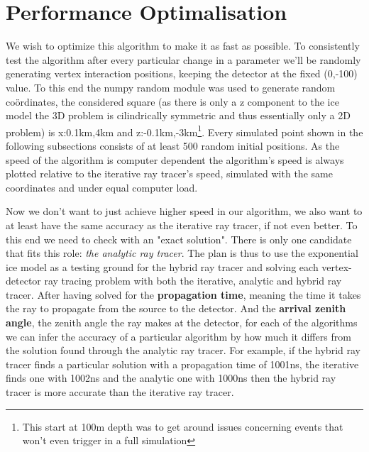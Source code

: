 \documentclass[11pt,a4paper,faculty=we,language=en,doctype=report]{cls/ugent-doc}
\begin{document}
\section{Performance Optimalisation} 
We wish to optimize this algorithm to make
it as fast as possible.  To consistently test the algorithm after every
particular change in a parameter we'll be randomly generating vertex
interaction positions, keeping the detector at the fixed (0,-100) value.  To
this end the numpy random module was used to generate random coördinates, the
considered square (as there is only a z component to the ice model the 3D
problem is cilindrically symmetric and thus essentially only a 2D problem) is
x:0.1km,4km and z:-0.1km,-3km\footnote{This start at 100m depth was to get
around issues concerning events that won't even trigger in a full simulation}.
Every simulated point shown in the following subsections consists of at least
500 random initial positions.  As the speed of the algorithm is computer
dependent the algorithm's speed is always plotted relative to the iterative ray
tracer's speed, simulated with the same coordinates and under equal computer load.

Now we don't want to just achieve higher speed in our algorithm, we also want
to at least have the same accuracy as the iterative ray tracer, if not even better.
To this end we need to check with an "exact solution". There is only one candidate
that fits this role: \textit{the analytic ray tracer}. The plan is thus to use the
exponential ice model as a testing ground for the hybrid ray tracer and solving each
vertex-detector ray tracing problem with both the iterative, analytic and hybrid ray tracer.
After having solved for the \textbf{propagation time}, meaning the time it takes the ray to
propagate from the source to the detector. And the \textbf{arrival zenith angle}, the zenith angle
the ray makes at the detector, for each of the algorithms we can infer the accuracy of a particular
algorithm by how much it differs from the solution found through the analytic ray tracer.
For example, if the hybrid ray tracer finds a particular solution with a propagation time of 
1001ns, the iterative finds one with 1002ns and the analytic one with 1000ns then the hybrid
ray tracer is more accurate than the iterative ray tracer.
\end{document}
